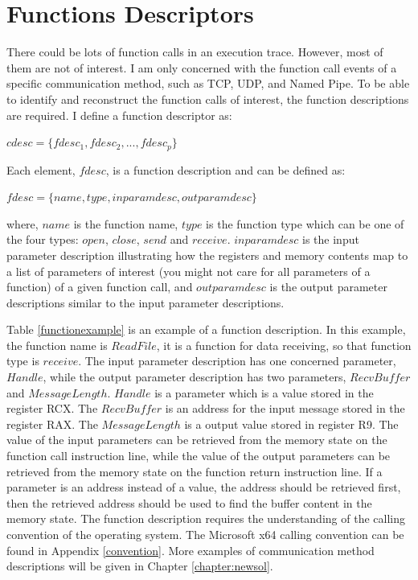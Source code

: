 \section{Functions Descriptors}\label{cdesc}
There could be lots of function calls in an execution trace. However, most of them are not of interest. I am only concerned with the function call events of a specific communication method, such as TCP, UDP, and Named Pipe. To be able to identify and reconstruct the function calls of interest, the function descriptions are required. I define a function descriptor as:

$cdesc = \lbrace fdesc_1, fdesc_2,...,fdesc_p \rbrace$

Each element, $fdesc$, is a function description and can be defined as:

$fdesc = \lbrace name, type, inparamdesc, outparamdesc \rbrace$

where, $name$ is the function name, $type$ is the function type which can be one of the four types: $open$, $close$, $send$ and $receive$. $inparamdesc$ is the input parameter description illustrating how the registers and memory contents map to a list of parameters of interest (you might not care for all parameters of a function) of a given function call, and $outparamdesc$ is the output parameter descriptions similar to the input parameter descriptions. 

Table \ref{functionexample} is an example of a function description. In this example, the function name is $ReadFile$, it is a function for data receiving, so that function type is $receive$. The input parameter description has one concerned parameter, $Handle$, while the output parameter description has two parameters, ${RecvBuffer}$ and $MessageLength$. $Handle$ is a parameter which is a value stored in the register RCX. The $RecvBuffer$ is an address for the input message stored in the register RAX. The $MessageLength$ is a output value stored in register R9. The value of the input parameters can be retrieved from the memory state on the function call instruction line, while the value of the output parameters can be retrieved from the memory state on the function return instruction line. If a parameter is an address instead of a value, the address should be retrieved first, then the retrieved address should be used to find the buffer content in the memory state. The function description requires the understanding of the calling convention of the operating system. The Microsoft x64 calling convention can be found in Appendix \ref{convention}. More examples of communication method descriptions will be given in Chapter \ref{chapter:newsol}.

